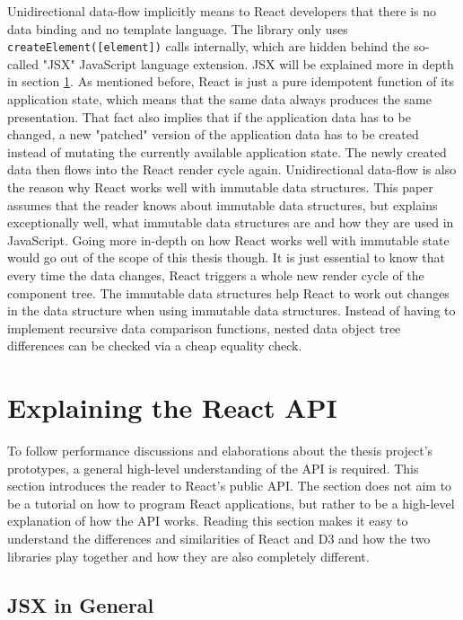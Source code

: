 Unidirectional data-flow implicitly means to React developers that there is no data binding and no template language. The library only uses \texttt{createElement([element])} calls internally, which are hidden behind the so-called "JSX" JavaScript language extension. JSX will be explained more in depth in section \ref{sec:reactApi}. As mentioned before, React is just a pure idempotent function of its application state, which means that the same data always produces the same presentation. That fact also implies that if the application data has to be changed, a new "patched" version of the application data has to be created instead of mutating the currently available application state. The newly created data then flows into the React render cycle again. Unidirectional data-flow is also the reason why React works well with immutable data structures. This paper assumes that the reader knows about immutable data structures, but \cite{ImmutableJS} explains exceptionally well, what immutable data structures are and how they are used in JavaScript. Going more in-depth on how React works well with immutable state would go out of the scope of this thesis though. It is just essential to know that every time the data changes,  React triggers a whole new render cycle of the component tree. The immutable data structures help React to work out changes in the data structure when using immutable data structures. Instead of having to implement recursive data comparison functions, nested data object tree differences can be checked via a cheap equality check.

\section{Explaining the React API}
\label{sec:reactApi}

To follow performance discussions and elaborations about the thesis project's prototypes, a general high-level understanding of the API is required. This section introduces the reader to React's public API. The section does not aim to be a tutorial on how to program React applications, but rather to be a high-level explanation of how the API works. Reading this section makes it easy to understand the differences and similarities of React and D3 and how the two libraries play together and how they are also completely different.

\subsection{JSX in General}

